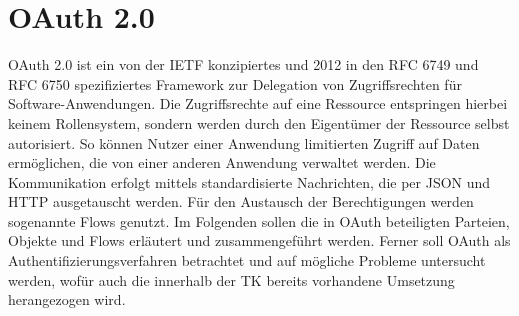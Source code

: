 \chapter{OAuth 2.0} OAuth 2.0 ist ein von der IETF konzipiertes und 2012 in den
RFC 6749 und RFC 6750 spezifiziertes Framework zur Delegation von
Zugriffsrechten für Software-Anwendungen. Die Zugriffsrechte auf eine Ressource
entspringen hierbei keinem Rollensystem, sondern werden durch den Eigentümer der
Ressource selbst autorisiert. So können Nutzer einer Anwendung limitierten
Zugriff auf Daten ermöglichen, die von einer anderen Anwendung verwaltet werden.
Die Kommunikation erfolgt mittels standardisierte Nachrichten, die per JSON und
HTTP ausgetauscht werden. Für den Austausch der Berechtigungen werden sogenannte
Flows genutzt. Im Folgenden sollen die in OAuth beteiligten Parteien, Objekte
und Flows erläutert und zusammengeführt werden. Ferner soll OAuth als
Authentifizierungsverfahren betrachtet und auf mögliche Probleme untersucht
werden, wofür auch die innerhalb der TK bereits vorhandene Umsetzung
herangezogen wird.





